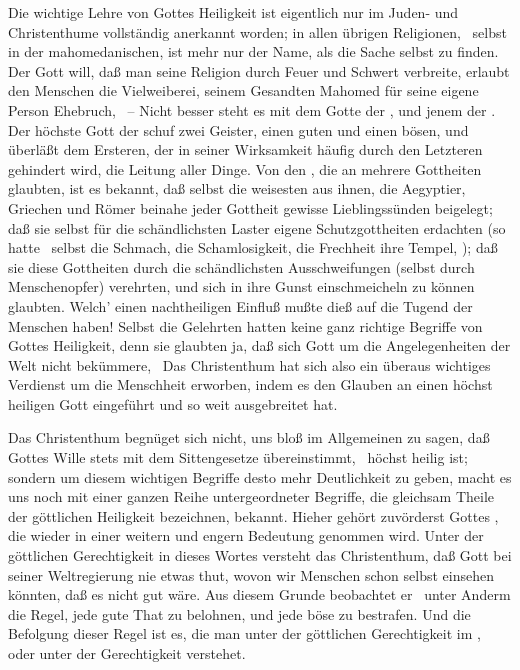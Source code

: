 Die wichtige Lehre von Gottes Heiligkeit ist eigentlich nur im Juden- und Christenthume vollständig anerkannt worden; in allen übrigen Religionen, \zB\ selbst in der mahomedanischen, ist mehr nur der Name, als die Sache selbst zu finden. Der Gott  will, daß man seine Religion durch Feuer und Schwert verbreite, erlaubt den Menschen die Vielweiberei, seinem Gesandten Mahomed für seine eigene Person Ehebruch, \usw\ -- Nicht besser steht es mit dem Gotte der , und jenem der . Der höchste Gott der  schuf zwei Geister, einen guten und einen bösen, und überläßt dem Ersteren, der in seiner Wirksamkeit häufig durch den Letzteren gehindert wird, die Leitung aller Dinge. Von den , die an mehrere Gottheiten glaubten, ist es bekannt, daß selbst die weisesten aus ihnen, die Aegyptier, Griechen und Römer beinahe jeder Gottheit gewisse Lieblingssünden beigelegt; daß sie selbst für die schändlichsten Laster eigene Schutzgottheiten erdachten (so hatte \zB\ selbst die Schmach, die Schamlosigkeit, die Frechheit ihre Tempel, ); daß sie diese Gottheiten durch die schändlichsten Ausschweifungen (selbst durch Menschenopfer) verehrten, und sich in ihre Gunst einschmeicheln zu können glaubten. Welch' einen nachtheiligen Einfluß mußte dieß auf die Tugend der Menschen haben! Selbst die Gelehrten hatten keine ganz richtige Begriffe von Gottes Heiligkeit, denn sie glaubten ja, daß sich Gott um die Angelegenheiten der Welt nicht bekümmere, \udgl\  Das Christenthum hat sich also ein überaus wichtiges Verdienst um die Menschheit erworben, indem es den Glauben an einen höchst heiligen Gott eingeführt und so weit ausgebreitet hat.

Das Christenthum begnüget sich nicht, uns bloß im Allgemeinen zu sagen, daß Gottes Wille stets mit dem Sittengesetze übereinstimmt, \dh\ höchst heilig ist; sondern um diesem wichtigen Begriffe desto mehr Deutlichkeit zu geben, macht es uns noch mit einer ganzen Reihe untergeordneter Begriffe, die gleichsam Theile der göttlichen Heiligkeit bezeichnen, bekannt. Hieher gehört zuvörderst Gottes , die wieder in einer weitern und engern Bedeutung genommen wird. Unter der göttlichen Gerechtigkeit in dieses Wortes  versteht das Christenthum, daß Gott bei seiner Weltregierung nie etwas thut, wovon wir Menschen schon selbst einsehen könnten, daß es nicht gut wäre. Aus diesem Grunde beobachtet er \zB\ unter Anderm die Regel, jede gute That zu belohnen, und jede böse zu bestrafen. Und die Befolgung dieser Regel ist es, die man unter der göttlichen Gerechtigkeit im , oder unter der  Gerechtigkeit verstehet.

